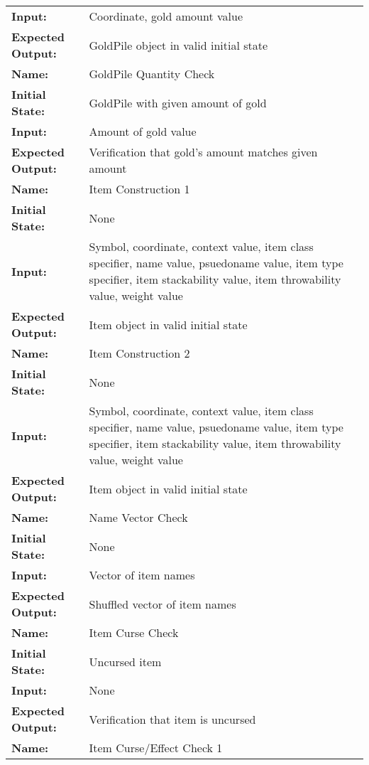 \documentclass[12pt, titlepage]{article}
\begin{document}
\begin{center}
\begin{longtable}{ l | p{10cm} }
				\textbf{Input:} & Coordinate, gold amount value\\
				\textbf{Expected Output:} & GoldPile object in valid initial state\\[0.6em]
				\hline
				\rule{0pt}{1.5em}\textbf{Name:} & GoldPile Quantity Check\\
				\textbf{Initial State:} & GoldPile with given amount of gold\\
				\textbf{Input:} & Amount of gold value\\
				\textbf{Expected Output:} & Verification that gold's amount matches given amount\\[0.6em]
				\hline
				\rule{0pt}{1.5em}\textbf{Name:} & Item Construction 1\\
				\textbf{Initial State:} & None\\
				\textbf{Input:} & Symbol, coordinate, context value, item class specifier, name value, psuedoname value, item type specifier, item stackability value, item throwability value, weight value\\
				\textbf{Expected Output:} & Item object in valid initial state\\[0.6em]
				\hline
				\rule{0pt}{1.5em}\textbf{Name:} & Item Construction 2\\
				\textbf{Initial State:} & None\\
				\textbf{Input:} & Symbol, coordinate, context value, item class specifier, name value, psuedoname value, item type specifier, item stackability value, item throwability value, weight value\\
				\textbf{Expected Output:} & Item object in valid initial state\\[0.6em]
				\hline
				\rule{0pt}{1.5em}\textbf{Name:} & Name Vector Check\\
				\textbf{Initial State:} & None\\
				\textbf{Input:} & Vector of item names\\
				\textbf{Expected Output:} & Shuffled vector of item names\\[0.6em]
				\hline
				\rule{0pt}{1.5em}\textbf{Name:} & Item Curse Check\\
				\textbf{Initial State:} & Uncursed item\\
				\textbf{Input:} & None\\
				\textbf{Expected Output:} & Verification that item is uncursed\\[0.6em]
				\hline
				\rule{0pt}{1.5em}\textbf{Name:} & Item Curse/Effect Check 1\\

\end{longtable}
\end{center}
\end{document}
